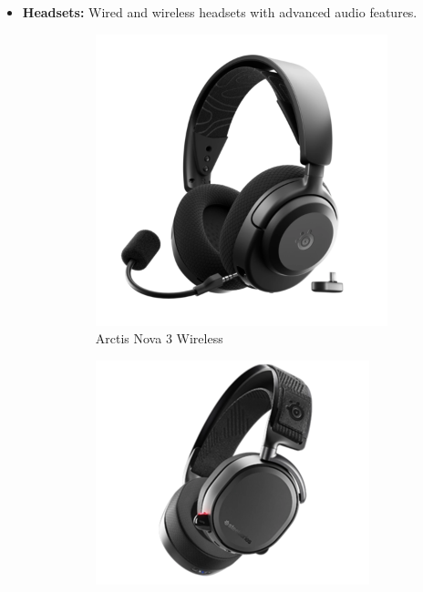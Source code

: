 \documentclass[a4paper,12pt]{report}
\begin{document}
\begin{itemize}
\begin{figure}[h!]
    \end{figure}
    \item \textbf{Headsets:} Wired and wireless headsets with advanced audio features.
    \begin{figure}[h!]
    \centering
    \begin{subfigure}[b]{0.25\textwidth}
        \includegraphics[width=\textwidth]{ressources/hs_2.png}
        \caption{Arctis Nova 3 Wireless}
    \end{subfigure}
    \hfill
    \begin{subfigure}[b]{0.25\textwidth}
        \includegraphics[width=\textwidth]{ressources/hs_3.png}

\end{subfigure}
\end{figure}
\end{itemize}
\end{document}

